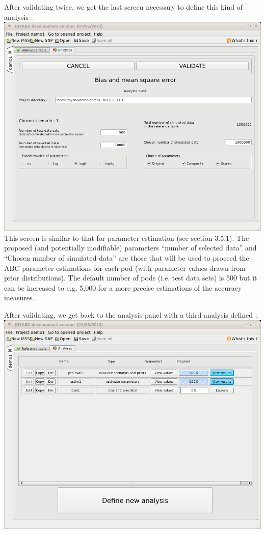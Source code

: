 After validating twice, we get the last screen necessary to define
this kind of analysis :\\


\includegraphics[scale=0.35]{gui_pictures/Capture-DIYABC-49} \\


This screen is similar to that for parameter estimation (see section
3.5.1). The proposed (and potentially modifiable) parameters ``number
of selected data'' and ``Chosen number of simulated data'' are
those that will be used to proceed the ABC parameter estimations for
each pod (with parameter values drawn from prior distributions). The
default number of pods (i.e. test data sets) is 500 but it can be
increased to e.g. 5,000 for a more precise estimations of the accuracy
measures.

After validating, we get back to the analysis panel with a third analysis
defined :\\


\includegraphics[scale=0.35]{gui_pictures/Capture-DIYABC-50} \\


